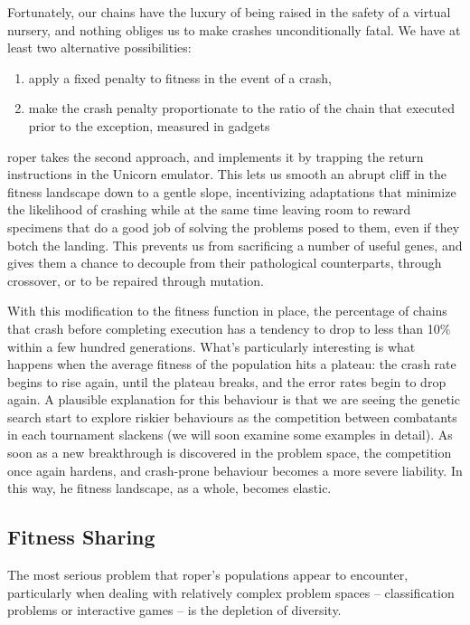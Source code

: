 \documentclass[12pt,glossary]{dalthesis}
\begin{document}
Fortunately, our chains have the luxury of being raised in the safety of a
virtual nursery, and nothing obliges us to make crashes unconditionally fatal.
We have at least two alternative possibilities:

\begin{enumerate}
\item apply a fixed penalty to fitness in the event of a crash,
\item make the crash penalty proportionate to the ratio of
the chain that executed prior to the exception, measured in gadgets
\end{enumerate}

\Gls{roper} takes the second approach, and implements it by
trapping the return instructions in the Unicorn emulator. This lets us smooth an
abrupt cliff in the fitness landscape down to a gentle slope, incentivizing
adaptations that minimize the likelihood of crashing while at the same time
leaving room to reward specimens that do a good job of solving the
problems posed to them, even if they botch the landing. This prevents us from
sacrificing a number of useful genes, and gives them a chance to decouple from
their pathological counterparts, through crossover, or to be repaired through
mutation.

With this modification to the fitness function in place, the percentage of
chains that crash before completing execution has a tendency to drop to less
than 10\% within a few hundred generations.  What's
particularly interesting is what happens when the average fitness of the
population hits a plateau: the crash rate begins to rise again, until the
plateau breaks, and the error rates begin to drop again. A plausible explanation
for this behaviour is that we are seeing the genetic search start to explore
riskier behaviours as the competition between combatants in each tournament
slackens (we will soon examine some examples in detail). As soon as a new
breakthrough is discovered in the problem space, the competition once again
hardens, and crash-prone behaviour becomes a more severe liability. In this way,
he fitness landscape, as a whole, becomes elastic.

\subsection{Fitness Sharing}
\label{sec:orgb1c7e74}
\label{org46b61c6}

The most serious problem that \gls{roper}'s populations appear to encounter, particularly
when dealing with relatively complex problem spaces -- classification problems or
interactive games -- is the depletion of diversity. 
\end{document}
